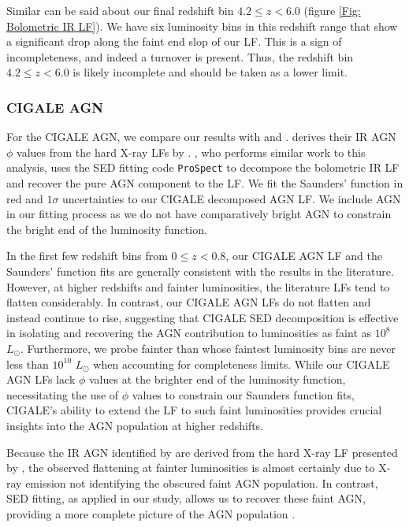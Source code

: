 Similar can be said about our final redshift bin $4.2 \leq z < 6.0$ (figure \ref{Fig: Bolometric IR LF}). We have six luminosity bins in this redshift range that show a significant drop along the faint end slop of our LF. This is a sign of incompleteness, and indeed a turnover is present. Thus, the redshift bin $4.2 \leq z < 6.0$ is likely incomplete and should be taken as a lower limit.

\subsubsection{CIGALE AGN}
For the CIGALE AGN, we compare our results with \cite{symeonidis_agn_2021} and \cite{thorne_deep_2022}. \cite{symeonidis_agn_2021} derives their IR AGN $\phi$ values from the hard X-ray LFs by \cite{aird_evolution_2015}. \cite{thorne_deep_2022}, who performs similar work to this analysis, uses the SED fitting code \texttt{ProSpect} \citep{leja_deriving_2017, robotham_prospect_2020} to decompose the bolometric IR LF and recover the pure AGN component to the LF. We fit the Saunders' function in red and $1\sigma$ uncertainties to our CIGALE decomposed AGN LF. We include \cite{thorne_deep_2022} AGN in our fitting process as we do not have comparatively bright AGN to constrain the bright end of the luminosity function. 

In the first few redshift bins from $0 \leq z < 0.8$, our CIGALE AGN LF and the Saunders' function fits are generally consistent with the results in the literature. However, at higher redshifts and fainter luminosities, the literature LFs tend to flatten considerably. In contrast, our CIGALE AGN LFs do not flatten and instead continue to rise, suggesting that CIGALE SED decomposition is effective in isolating and recovering the AGN contribution to luminosities as faint as $10^8$ $L_{\odot}$. Furthermore, we probe fainter than \cite{thorne_deep_2022} whose faintest luminosity bins are never less than $10^{10}$ $L_{\odot}$ when accounting for completeness limits. While our CIGALE AGN LFs lack $\phi$ values at the brighter end of the luminosity function, necessitating the use of \cite{thorne_deep_2022} $\phi$ values to constrain our Saunders function fits, CIGALE's ability to extend the LF to such faint luminosities provides crucial insights into the AGN population at higher redshifts.

Because the IR AGN identified by \cite{symeonidis_agn_2021} are derived from the hard X-ray LF presented by \cite{aird_evolution_2015}, the observed flattening at fainter luminosities is almost certainly due to X-ray emission not identifying the obscured faint AGN population. In contrast, SED fitting, as applied in our study, allows us to recover these faint AGN, providing a more complete picture of the AGN population \citep{gruppioni_modelling_2011, brown_infrared_2019, thorne_deep_2022}. 

